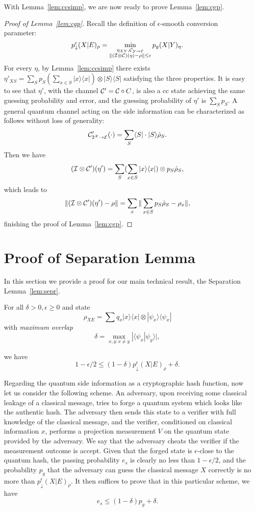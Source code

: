 With Lemma~\ref{lem:ccsimp}, we are now ready to prove Lemma~\ref{lem:cgp}.
\begin{proof}[Proof of Lemma~\ref{lem:cgp}]
	Recall the definition of $\epsilon$-smooth conversion parameter:
    $$p^{\epsilon}_\downarrow(X|E)_\rho=\min_{\substack{\eta_{XY},\mathcal{C}_{\mathcal{Y}\rightarrow \mathcal{E}}\\\Vert(\mathcal{I}\otimes \mathcal{C})(\eta)-\rho\Vert\leq \epsilon}}p_g(X|Y)_\eta.$$
    For every $\eta$, by Lemma~\ref{lem:ccsimp} there exists $\eta'_{XS}=\sum_Sp_S(\sum_{x\in S}|x\rangle\langle x|)\otimes |S\rangle\langle S|$ satisfying the three properties. It is easy to see that $\eta'$, with the channel $\mathcal{C}'=\mathcal{C}\circ C$, is also a cc state achieving the same guessing probability and error, and the guessing probability of $\eta'$ is $\sum_Sp_S$. A general quantum channel acting on the side information can be characterized as follows without loss of generality:
    $$\mathcal{C}'_{2^{\mathcal{X}}\rightarrow \mathcal{E}}(\cdot)=\sum_{S}\langle S|\cdot|S\rangle\hat{\rho}_S.$$
    Then we have
    $$(\mathcal{I}\otimes \mathcal{C}')(\eta')=\sum_S(\sum_{x\in S}|x\rangle\langle x|)\otimes p_S\hat{\rho}_S,$$
    which leads to
    $$\Vert (\mathcal{I}\otimes \mathcal{C}')(\eta')-\rho\Vert=\sum_x\Vert\sum_{x\in S}p_S\hat{\rho}_S-\rho_x\Vert,$$
    finishing the proof of Lemma~\ref{lem:cgp}.
\end{proof}


\section{Proof of Separation Lemma}
\label{sec:prf}
In this section we provide a proof for our main technical result, the Separation Lemma~\ref{lem:sepr}.


\begin{lemma}
\label{lem:sepr}
For all $\delta>0, \epsilon\geq 0$ and state
$$\rho_{XE}=\sum q_x|x\rangle\langle x|\otimes |\psi_x\rangle\langle \psi_x|$$
with \emph{maximum overlap} 
$$\delta=\max_{x,y:x\neq y}|\langle\psi_x| \psi_y\rangle|,$$

we have
    $$1-\epsilon/2\leq (1-\delta)p_{\downarrow}^{\epsilon}(X|E)_\rho+\delta.$$
\end{lemma}


Regarding the quantum side information as a cryptographic hash function, now let us consider the following scheme. An adversary, upon receiving some classical leakage of a classical message, tries to forge a quantum system which looks like the authentic hash. The adversary then sends this state to a verifier with full knowledge of the classical message, and the verifier, conditioned on classical information $x$, performs a projection measurement $V$ on the quantum state provided by the
adversary. We say that the adversary cheats the verifier if the measurement outcome is accept. Given that the forged state is $\epsilon$-close to the quantum hash, the passing probability $e_s$ is clearly no less than $1-\epsilon/2$, and the probability $p_g$ that the adversary can guess the classical message $X$ correctly is no more than $p^{\epsilon}_{\downarrow }(X|E)_{\rho}$. It then suffices to prove that in this particular scheme, we have
$$e_s\leq (1-\delta)p_g+\delta.$$


